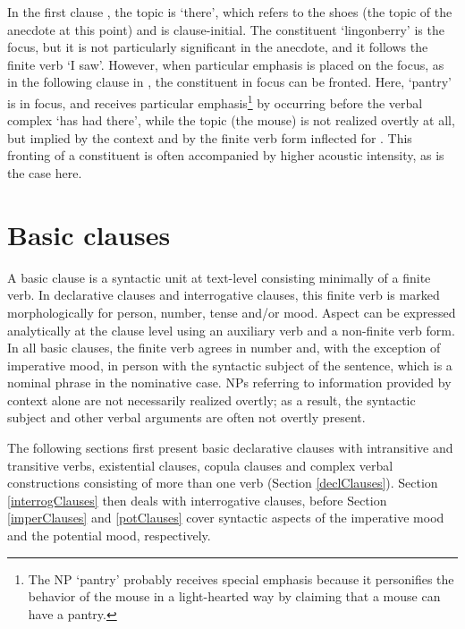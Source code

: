 In the first clause , the topic is  ‘there’, which refers to the shoes (the topic of the anecdote at this point) and is clause-initial. The constituent  ‘lingonberry’ is the focus, but it is not particularly significant in the anecdote, and it follows the finite verb  ‘I saw’. 
However, when particular emphasis is placed on the focus, as in the following clause in , the constituent in focus can be fronted. Here,  ‘pantry’ is in focus, and receives particular emphasis\footnote{The NP  ‘pantry’ probably receives special emphasis because it personifies the behavior of the mouse in a light-hearted way by claiming that a mouse can have a pantry.} by occurring before the verbal complex  ‘has had there’, while the topic (the mouse) is not realized overtly at all, but implied by the context and by the finite verb form inflected for . 
This fronting of a constituent is often accompanied by higher acoustic intensity, as is the case here.%






\chapter{Basic clauses}\label{basicClauses}
A basic clause is a syntactic unit at text-level consisting minimally of a finite verb. In declarative clauses and interrogative clauses, this finite verb is marked morphologically for person, number, tense and/or mood. Aspect can be expressed analytically at the clause level using an auxiliary verb and a non-finite verb form. 
In all basic clauses, the finite verb agrees in number and, with the exception of imperative mood, in person with the syntactic subject of the sentence, which is a nominal phrase in the nominative case. 
NPs referring to information provided by context alone are not necessarily realized overtly; as a result, the syntactic subject and other verbal arguments are often not overtly present. 

The following sections first present basic declarative clauses with intransitive and transitive verbs, existential clauses, copula clauses and complex verbal constructions consisting of more than one verb (Section \ref{declClauses}). Section \ref{interrogClauses} then deals with interrogative clauses, %
before Section \ref{imperClauses} and \ref{potClauses} cover syntactic aspects of the imperative mood and the potential mood, respectively.


